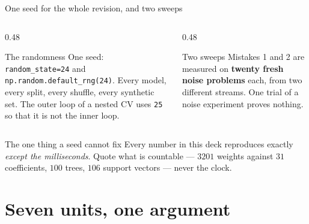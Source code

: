 \documentclass[aspectratio=169]{beamer}
\begin{document}
\begin{frame}{One seed for the whole revision, and two sweeps}
  \begin{columns}[T]
    \begin{column}{0.48\textwidth}
      \begin{block}{The randomness}
        \small One seed: \texttt{random\_state=24} and
        \texttt{np.random.default\_rng(24)}. Every model, every split, every
        shuffle, every synthetic set. The outer loop of a nested CV uses
        \texttt{25} so that it is not the inner loop.
      \end{block}
    \end{column}
    \begin{column}{0.48\textwidth}
      \begin{block}{Two sweeps}
        \small Mistakes 1 and 2 are measured on \textbf{twenty fresh noise
        problems} each, from two different streams. One trial of a noise
        experiment proves nothing.
      \end{block}
    \end{column}
  \end{columns}
  \vspace{0.5em}
  \begin{alertblock}{The one thing a seed cannot fix}
    \centering\small
    Every number in this deck reproduces exactly \emph{except the
    milliseconds}. Quote what is countable --- $3201$ weights against $31$
    coefficients, $100$ trees, $106$ support vectors --- never the clock.
  \end{alertblock}
\end{frame}

\section[The spine]{Seven units, one argument}
\label{sec:spine}
\end{document}
